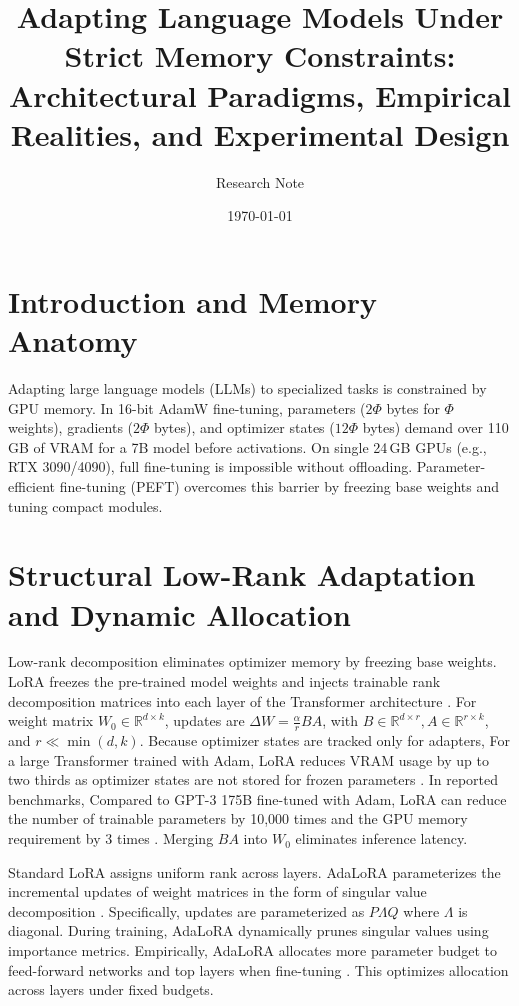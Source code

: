 \documentclass[11pt,a4paper]{article}
\title{\textbf{Adapting Language Models Under Strict Memory Constraints:\\Architectural Paradigms, Empirical Realities, and Experimental Design}}
\author{Research Note}
\date{\today}
\begin{document}
\maketitle

\section{Introduction and Memory Anatomy}
Adapting large language models (LLMs) to specialized tasks is constrained by GPU memory. In 16-bit AdamW fine-tuning, parameters ($2\Phi$ bytes for $\Phi$ weights), gradients ($2\Phi$ bytes), and optimizer states ($12\Phi$ bytes) demand over 110\,GB of VRAM for a 7B model before activations. On single 24\,GB GPUs (e.g., RTX 3090/4090), full fine-tuning is impossible without offloading. Parameter-efficient fine-tuning (PEFT) overcomes this barrier by freezing base weights and tuning compact modules.

\section{Structural Low-Rank Adaptation and Dynamic Allocation}
Low-rank decomposition eliminates optimizer memory by freezing base weights. LoRA freezes the pre-trained model weights and injects trainable rank decomposition matrices into each layer of the Transformer architecture \cite{hu2021lora}. For weight matrix $W_0 \in \mathbb{R}^{d \times k}$, updates are $\Delta W = \frac{\alpha}{r} B A$, with $B \in \mathbb{R}^{d \times r}, A \in \mathbb{R}^{r \times k}$, and $r \ll \min(d, k)$. Because optimizer states are tracked only for adapters, For a large Transformer trained with Adam, LoRA reduces VRAM usage by up to two thirds as optimizer states are not stored for frozen parameters \cite{hu2021lora}. In reported benchmarks, Compared to GPT-3 175B fine-tuned with Adam, LoRA can reduce the number of trainable parameters by 10,000 times and the GPU memory requirement by 3 times \cite{hu2021lora}. Merging $BA$ into $W_0$ eliminates inference latency.

Standard LoRA assigns uniform rank across layers. AdaLoRA parameterizes the incremental updates of weight matrices in the form of singular value decomposition \cite{zhang2023adalora}. Specifically, updates are parameterized as $P \Lambda Q$ where $\Lambda$ is diagonal. During training, AdaLoRA dynamically prunes singular values using importance metrics. Empirically, AdaLoRA allocates more parameter budget to feed-forward networks and top layers when fine-tuning \cite{zhang2023adalora}. This optimizes allocation across layers under fixed budgets.
\end{document}
